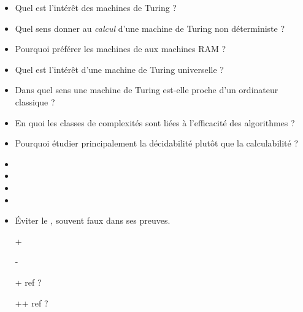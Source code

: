 \documentclass{agregfiche}
\begin{document}
\secquestionsclassiques

\begin{itemize}
    \item Quel est l'intérêt des machines de Turing ?
    \item Quel sens donner au \emph{calcul} d'une machine de Turing non
        déterministe ?
    \item Pourquoi préférer les machines de  aux machines RAM ?
    \item Quel est l'intérêt d'une machine de Turing universelle ?
    \item Dans quel sens une machine de Turing est-elle proche d'un ordinateur
        classique ?
    \item En quoi les classes de complexités sont liées à l'efficacité des
        algorithmes ?
    \item Pourquoi étudier principalement la décidabilité plutôt que la
        calculabilité ?
\end{itemize}

\secreferences

\begin{itemize}
    \item 
    \item 
    \item 
    \item 
    \item Éviter le , souvent faux dans ses preuves.
\end{itemize}


\secdev

\begin{itemize}
    \item[+] 
    \item[-] 
    \item[+]  ref ?
    \item[++]  ref ?
    
\end{itemize}
\end{document}
